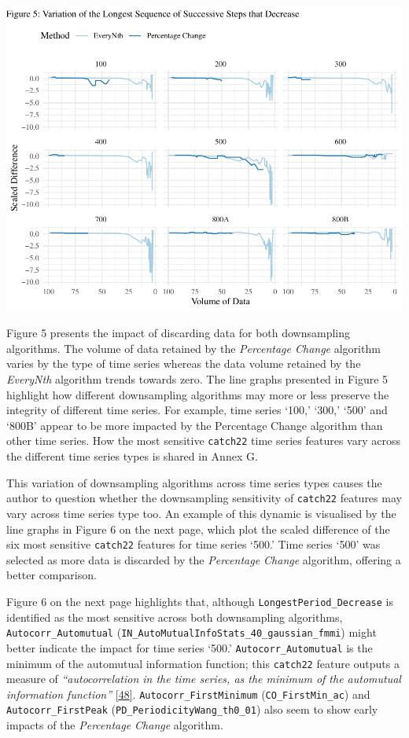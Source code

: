 \documentclass{article}
\begin{document}
\includegraphics{210431461_CSC8639_Dissertation_files/figure-latex/LongestDecreases-1.pdf}

Figure 5 presents the impact of discarding data for both downsampling
algorithms. The volume of data retained by the \emph{Percentage Change}
algorithm varies by the type of time series whereas the data volume
retained by the \emph{EveryNth} algorithm trends towards zero. The line
graphs presented in Figure 5 highlight how different downsampling
algorithms may more or less preserve the integrity of different time
series. For example, time series `100,' `300,' `500' and `800B' appear
to be more impacted by the Percentage Change algorithm than other time
series. How the most sensitive \texttt{catch22} time series features
vary across the different time series types is shared in Annex G.

This variation of downsampling algorithms across time series types
causes the author to question whether the downsampling sensitivity of
\texttt{catch22} features may vary across time series type too. An
example of this dynamic is visualised by the line graphs in Figure 6 on
the next page, which plot the scaled difference of the six most
sensitive \texttt{catch22} features for time series `500.' Time series
`500' was selected as more data is discarded by the \emph{Percentage
Change} algorithm, offering a better comparison.

Figure 6 on the next page highlights that, although
\texttt{LongestPeriod\_Decrease} is identified as the most sensitive
across both downsampling algorithms, \texttt{Autocorr\_Automutual}
(\texttt{IN\_AutoMutualInfoStats\_40\_gaussian\_fmmi}) might better
indicate the impact for time series `500.' \texttt{Autocorr\_Automutual}
is the minimum of the automutual information function; this
\texttt{catch22} feature outputs a measure of \emph{``autocorrelation in
the time series, as the minimum of the automutual information
function''} \protect\hyperlink{ref-feature_book}{{[}48{]}}.
\texttt{Autocorr\_FirstMinimum} (\texttt{CO\_FirstMin\_ac}) and
\texttt{Autocorr\_FirstPeak} (\texttt{PD\_PeriodicityWang\_th0\_01})
also seem to show early impacts of the \emph{Percentage Change}
algorithm.
\end{document}
